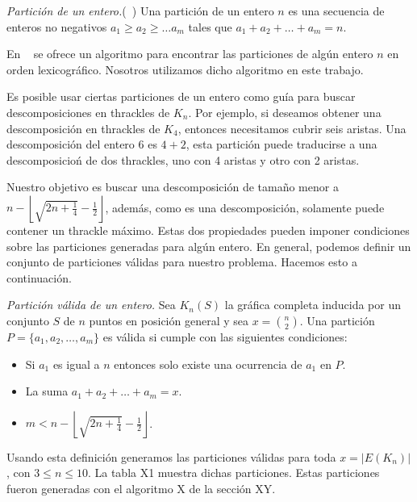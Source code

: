     \begin{definition}{\emph{Partición de un entero.}(~\cite{Knuth2011})}
      Una partición de un entero $n$ es una secuencia de enteros no negativos $a_1 \geq a_2 \geq \dots a_m$ tales que $a_1 + a_2 + \dots + a_m = n$.
    \end{definition}

    En ~\cite{Knuth2011} se ofrece un algoritmo para encontrar las particiones de algún entero $n$ en orden lexicográfico. Nosotros utilizamos dicho algoritmo en este trabajo.

    Es posible usar ciertas particiones de un entero como guía para buscar descomposiciones en thrackles de $K_n$. Por ejemplo, si  deseamos obtener una descomposición en thrackles de $K_4$, entonces necesitamos cubrir seis aristas. Una descomposición del entero 6 es $4+2$, esta partición puede traducirse a una descomposicioń de dos thrackles, uno con 4 aristas y otro con 2 aristas.

    Nuestro objetivo es buscar una descomposición de tamaño menor a $n - \left\lfloor\sqrt{2n+\frac{1}{4}} - \frac{1}{2}\right\rfloor$, además, como es una descomposición, solamente puede contener un thrackle máximo. Estas dos propiedades pueden imponer condiciones sobre las particiones generadas para algún entero. En general, podemos definir un conjunto de particiones válidas para nuestro problema. Hacemos esto a continuación.

    \begin{definition}{\emph{Partición válida de un entero.}}
      Sea $K_n(S)$ la gráfica completa inducida por un conjunto $S$ de $n$ puntos en posición general y sea $x=\binom{n}{2}$. Una partición $P=\{a_1,a_2,\dots,a_m\}$ es válida si cumple con las siguientes condiciones:
      \begin{itemize}
        \item Si $a_1$ es igual a $n$ entonces solo existe una ocurrencia de $a_1$ en $P$.
        \item La suma $a_1 + a_2 + \dots + a_m = x$.
        \item $m < n - \left\lfloor\sqrt{2n+\frac{1}{4}} - \frac{1}{2}\right\rfloor$.
      \end{itemize}
    \end{definition}

    Usando esta definición generamos las particiones válidas para toda $x=|E(K_n)|$, con $ 3 \leq n \leq 10$. La tabla X1 muestra dichas particiones. Estas particiones fueron generadas con el algoritmo X de la sección XY.

